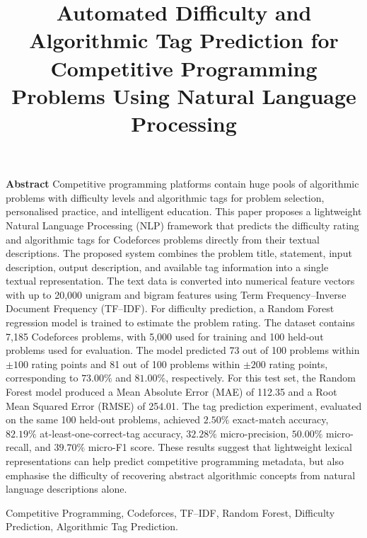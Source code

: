 \documentclass[conference]{IEEEtran}
\title{
Automated Difficulty and Algorithmic Tag Prediction for
Competitive Programming Problems Using Natural Language Processing
}
\author{
\vspace{4cm}

}
\begin{document}
\maketitle

\textbf{Abstract}  Competitive programming platforms contain huge pools of algorithmic problems
with difficulty levels and algorithmic tags for problem selection, personalised
practice, and intelligent education. This paper proposes a lightweight Natural
Language Processing (NLP) framework that predicts the difficulty rating and
algorithmic tags for Codeforces problems directly from their textual
descriptions.
The proposed system combines the problem title, statement, input description,
output description, and available tag information into a single textual
representation. The text data is converted into numerical feature vectors with
up to 20,000 unigram and bigram features using Term Frequency--Inverse Document
Frequency (TF--IDF). For difficulty prediction, a Random Forest regression
model is trained to estimate the problem rating.
The dataset contains 7,185 Codeforces problems, with 5,000 used for training
and 100 held-out problems used for evaluation.
The model predicted 73 out of 100 problems within $\pm100$ rating points and
81 out of 100 problems within $\pm200$ rating points, corresponding to
$73.00\%$ and $81.00\%$, respectively.
For this test set, the Random Forest model produced a Mean Absolute Error
(MAE) of 112.35 and a Root Mean Squared Error (RMSE) of 254.01. The tag
prediction experiment, evaluated on the same 100 held-out problems, achieved
$2.50\%$ exact-match accuracy, $82.19\%$ at-least-one-correct-tag accuracy,
$32.28\%$ micro-precision, $50.00\%$ micro-recall, and $39.70\%$ micro-F1
score.
These results suggest that lightweight lexical representations can help predict
competitive programming metadata, but also emphasise the difficulty of
recovering abstract algorithmic concepts from natural language descriptions
alone.


\begin{IEEEkeywords}
Competitive Programming, Codeforces, 
TF--IDF, Random Forest, Difficulty Prediction, Algorithmic Tag Prediction.

\end{IEEEkeywords}
\end{document}
